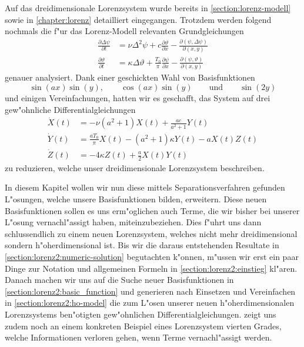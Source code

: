 Auf das dreidimensionale Lorenzsystem wurde bereits in 
\cref{section:lorenz-modell} sowie in \cref{chapter:lorenz} detailliert 
eingegangen. Trotzdem werden folgend nochmals die f"ur das Lorenz-Modell 
relevanten Grundgleichungen
\begin{equation}
	\begin{aligned}
	\frac{\partial\Delta\psi}{\partial t}
	&=
	\nu\Delta^2\psi 
	+c\frac{\partial\vartheta}{\partial x}
	-\frac{\partial(\psi,\Delta\psi)}{\partial(x,y)}
	\\
	\frac{\partial\vartheta}{\partial t}
	&=
	\kappa\Delta\vartheta
	+ \frac{T_0}{\pi}\frac{\partial\psi}{\partial x}
	- \frac{\partial(\psi,\vartheta)}{\partial(x,y)}
	\end{aligned}
	\label{equation:lorenz2:base}
\end{equation}
genauer analysiert. Dank einer geschickten Wahl von Basisfunktionen
\begin{equation*}
	\sin(ax)\sin(y),
	\qquad
	\cos(ax)\sin(y)
	\qquad\text{und}\qquad
	\sin(2y)
\end{equation*}
und einigen Vereinfachungen, hatten wir es geschafft, das System auf drei 
gew"ohnliche Differentialgleichungen
\begin{equation*}
	\begin{aligned}
	\dot X(t)
	&=
	-\nu(a^2+1)X(t)
	+\frac{ac}{a^2+1}Y(t)
	\\
	\dot Y(t)
	&=
	\frac{aT_0}{\pi}X(t)
	-(a^2+1)\kappa Y(t)
	-aX(t)Z(t)
	\\
	\dot Z(t)
	&=
	-4\kappa Z(t)
	+\frac{a}{2}X(t)Y(t)
	\end{aligned}
\end{equation*}
zu reduzieren, welche unser dreidimensionale Lorenzsystem beschreiben.

In diesem Kapitel wollen wir nun diese mittels Separationsverfahren gefunden 
L"osungen, welche unsere Basisfunktionen bilden, erweitern. Diese neuen 
Basisfunktionen sollen es uns erm"oglichen auch Terme, die wir bisher bei 
unserer L"osung vernachl"assigt haben, miteinzubeziehen. Dies f"uhrt uns dann 
schlussendlich zu einem neuen Lorenzsystem, welches nicht mehr 
dreidimensional sondern h"oherdimensional ist. Bis wir die daraus entstehenden 
Resultate in \cref{section:lorenz2:numeric-solution} begutachten k"onnen, 
m"ussen wir erst ein paar Dinge zur Notation und allgemeinen Formeln in 
\cref{section:lorenz2:einstieg} kl"aren. Danach machen wir uns auf die Suche 
neuer Basisfunktionen in \cref{section:lorenz2:basic_function} und generieren 
nach Einsetzen und Vereinfachen in \cref{section:lorenz2:ho-model} die zum 
L"osen unserer neuen h"oherdimensionalen Lorenzsystems ben"otigten 
gew"ohnlichen Differentialgleichungen.  
zeigt uns zudem noch an einem konkreten Beispiel eines Lorenzsystem vierten 
Grades, welche Informationen verloren gehen, wenn Terme vernachl"assigt werden.
